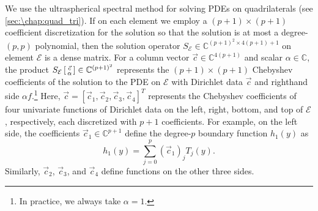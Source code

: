 We use the ultraspherical spectral method for solving PDEs on quadrilaterals (see \cref{sec:\chap:quad_tri}). If on each element we employ a $(p+1) \times (p+1)$ coefficient discretization for the solution so that the solution is at most a degree-$(p,p)$ polynomial, then the solution operator $S_\mathcal{E} \in \mathbb{C}^{(p+1)^2 \times 4(p+1)+1}$ on element $\mathcal{E}$ is a dense matrix. For a column vector $\vec{c} \in \mathbb{C}^{4(p+1)}$ and scalar $\alpha \in \mathbb{C}$, the product $S_\mathcal{E} \,\begin{bsmallmatrix} \vec{c} \\ \alpha \end{bsmallmatrix} \in \mathbb{C}^{(p+1)^2}$ represents the $(p+1) \times (p+1)$ Chebyshev coefficients of the solution to the PDE on $\mathcal{E}$ with Dirichlet data $\vec{c}$ and righthand side $\alpha f$.\footnote{In practice, we always take $\alpha = 1$.} Here, $\vec{c} = [\vec{c}_1, \vec{c}_2, \vec{c}_3, \vec{c}_4]^T$ represents the Chebyshev coefficients of four univariate functions of Dirichlet data on the left, right, bottom, and top of $\mathcal{E}$, respectively, each discretized with $p+1$ coefficients. For example, on the left side, the coefficients $\vec{c}_1 \in \mathbb{C}^{p+1}$ define the degree-$p$ boundary function $h_1(y)$ as
\[
h_1(y) = \sum_{j=0}^p (\vec{c}_1)_j T_j(y).
\]
Similarly, $\vec{c}_2$, $\vec{c}_3$, and $\vec{c}_4$ define functions on the other three sides.

